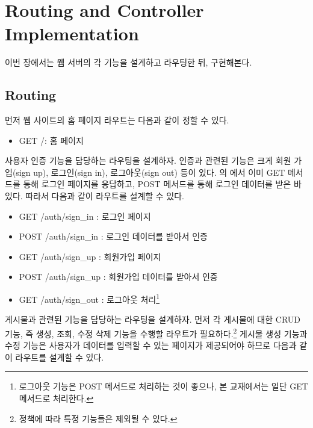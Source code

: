 \section{Routing and Controller Implementation}\label{sect:routing-and-controller-implementation}

이번 장에서는 웹 서버의 각 기능을 설계하고 라우팅한 뒤, 구현해본다.

\subsection*{Routing}

먼저 웹 사이트의 홈 페이지 라우트는 다음과 같이 정할 수 있다.

\begin{itemize}
    \item GET /: 홈 페이지
\end{itemize}

사용자 인증 기능을 담당하는 라우팅을 설계하자. 인증과 관련된 기능은 크게 회원 가입(sign up), 로그인(sign in), 로그아웃(sign out) 등이 있다. 의 에서 이미 GET 메서드를 통해 로그인 페이지를 응답하고, POST 메서드를 통해 로그인 데이터를 받은 바 있다. 따라서 다음과 같이 라우트를 설계할 수 있다.

\begin{itemize}
    \item GET /auth/sign\_in : 로그인 페이지
    \item POST /auth/sign\_in : 로그인 데이터를 받아서 인증
    \item GET /auth/sign\_up : 회원가입 페이지
    \item POST /auth/sign\_up : 회원가입 데이터를 받아서 인증
    \item GET /auth/sign\_out : 로그아웃 처리\footnote{로그아웃 기능은 POST 메서드로 처리하는 것이 좋으나, 본 교재에서는 일단 GET 메서드로 처리한다.}
\end{itemize}

게시물과 관련된 기능을 담당하는 라우팅을 설계하자. 먼저 각 게시물에 대한 CRUD 기능, 즉 생성, 조회, 수정 삭제 기능을 수행할 라우트가 필요하다.\footnote{정책에 따라 특정 기능들은 제외될 수 있다.} 게시물 생성 기능과 수정 기능은 사용자가 데이터를 입력할 수 있는 페이지가 제공되어야 하므로 다음과 같이 라우트를 설계할 수 있다.

